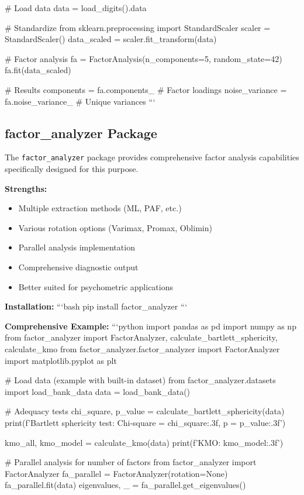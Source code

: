 \documentclass[a4paper]{tufte-book}
\begin{document}
# Load data
data = load_digits().data

# Standardize
from sklearn.preprocessing import StandardScaler
scaler = StandardScaler()
data_scaled = scaler.fit_transform(data)

# Factor analysis
fa = FactorAnalysis(n_components=5, random_state=42)
fa.fit(data_scaled)

# Results
components = fa.components_  # Factor loadings
noise_variance = fa.noise_variance_  # Unique variances
```

\subsection{factor\_analyzer Package}

The \texttt{factor\_analyzer} package provides comprehensive factor analysis capabilities specifically designed for this purpose.

\textbf{Strengths:}
\begin{itemize}
\item Multiple extraction methods (ML, PAF, etc.)
\item Various rotation options (Varimax, Promax, Oblimin)
\item Parallel analysis implementation
\item Comprehensive diagnostic output
\item Better suited for psychometric applications
\end{itemize}

\textbf{Installation:}
```bash
pip install factor_analyzer
```

\textbf{Comprehensive Example:}
```python
import pandas as pd
import numpy as np
from factor_analyzer import FactorAnalyzer, calculate_bartlett_sphericity, calculate_kmo
from factor_analyzer.factor_analyzer import FactorAnalyzer
import matplotlib.pyplot as plt

# Load data (example with built-in dataset)
from factor_analyzer.datasets import load_bank_data
data = load_bank_data()

# Adequacy tests
chi_square, p_value = calculate_bartlett_sphericity(data)
print(f'Bartlett sphericity test: Chi-square = {chi_square:.3f}, p = {p_value:.3f}')

kmo_all, kmo_model = calculate_kmo(data)
print(f'KMO: {kmo_model:.3f}')

# Parallel analysis for number of factors
from factor_analyzer import FactorAnalyzer
fa_parallel = FactorAnalyzer(rotation=None)
fa_parallel.fit(data)
eigenvalues, _ = fa_parallel.get_eigenvalues()
\end{document}
